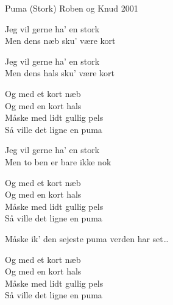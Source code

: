\begin{song}{Puma (Stork)}{}
  {\SBOrgMel}
  {Roben og Knud}
  {2001}
  {\NotCCLIed}

  \begin{SBVerse}
    Jeg vil gerne ha' en stork\\
    Men dens næb sku' være kort\\
  \end{SBVerse}

  \begin{SBVerse}
    Jeg vil gerne ha' en stork\\
    Men dens hals sku' være kort\\
  \end{SBVerse}

  \begin{SBSection*}
    Og med et kort næb\\
    Og med en kort hals\\
    Måske med lidt gullig pels\\
    Så ville det ligne en puma
  \end{SBSection*}

  \begin{SBChorus}
  \end{SBChorus}

  \begin{SBVerse}
    Jeg vil gerne ha' en stork\\
    Men to ben er bare ikke nok\\
  \end{SBVerse}

  \begin{SBSection*}
    Og med et kort næb\\
    Og med en kort hals\\
    Måske med lidt gullig pels\\
    Så ville det ligne en puma
  \end{SBSection*}

  \begin{SBChorus}
    Måske ik' den sejeste puma verden har set\ldots
  \end{SBChorus}

  \begin{SBSection*}
    Og med et kort næb\\
    Og med en kort hals\\
    Måske med lidt gullig pels\\
    Så ville det ligne en puma
  \end{SBSection*}


\end{song}
